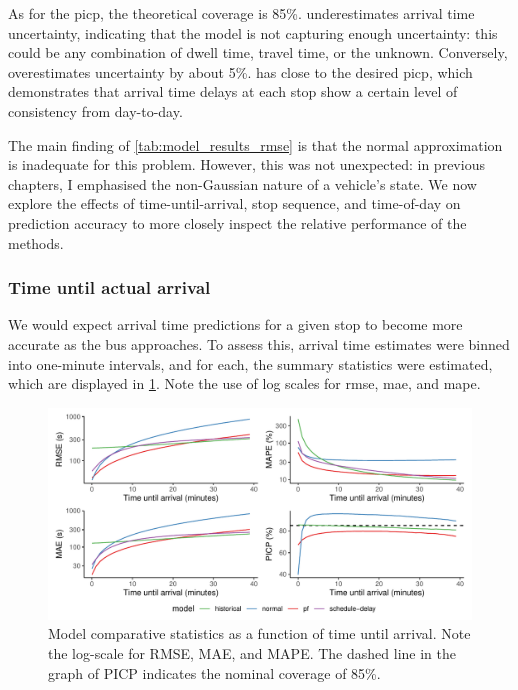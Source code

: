 As for the \gls{picp}, the theoretical coverage is 85\%. \Fpf{} underestimates arrival time uncertainty, indicating that the model is not capturing enough uncertainty: this could be any combination of dwell time, travel time, or the unknown. Conversely, \Fnorm{} overestimates uncertainty by about 5\%. \Fhist{} has close to the desired \gls{picp}, which demonstrates that arrival time delays at each stop show a certain level of consistency from day-to-day.


The main finding of \cref{tab:model_results_rmse} is that the normal approximation is inadequate for this problem. However, this was not unexpected: in previous chapters, I emphasised the non-Gaussian nature of a vehicle's state. We now explore the effects of time-until-arrival, stop sequence, and time-of-day on prediction accuracy to more closely inspect the relative performance of the methods.


\subsubsection{Time until actual arrival}

We would expect arrival time predictions for a given stop to become more accurate as the bus approaches. To assess this, arrival time estimates were binned into one-minute intervals, and for each, the summary statistics were estimated, which are displayed in \cref{fig:model_results_rmse_time}. Note the use of log scales for \gls{rmse}, \gls{mae}, and \gls{mape}.


\begin{knitrout}\small
{}\color{fgcolor}\begin{figure}
\includegraphics[width=\textwidth]{figure/model_results_rmse_time-1} \caption[Model comparative statistics as a function of time until arrival]{Model comparative statistics as a function of time until arrival. Note the log-scale for RMSE, MAE, and MAPE. The dashed line in the graph of PICP indicates the nominal coverage of 85\%.}\label{fig:model_results_rmse_time}
\end{figure}


\end{knitrout}

